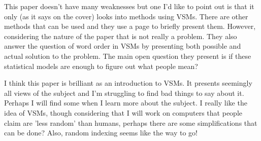 \begin{review}
    This paper doesn't have many weaknesses but one I'd like to point out is that it only (as it says on the cover) looks into methods using VSMs.
    There are other methods that can be used and they use a page to briefly present them.
    However, considering the nature of the paper that is not really a problem.
    They also answer the question of word order in VSMs by presenting both possible and actual solution to the problem.
    The main open question they present is if these statistical models are enough to figure out what people mean?
    
    I think this paper is brilliant as an introduction to VSMs.
    It presents seemingly all views of the subject and I'm struggling to find bad things to say about it.
    Perhaps I will find some when I learn more about the subject.
    I really like the idea of VSMs, though considering that I will work on computers that people claim are 'less random' than humans, perhaps there are some simplifications that can be done?
    Also, random indexing seems like the way to go!
\end{review}
